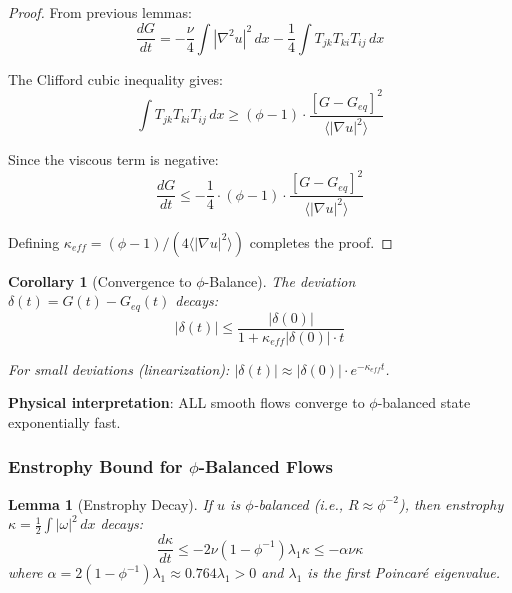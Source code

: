 \documentclass[12pt,a4paper]{article}
\newtheorem{lemma}[theorem]{Lemma}
\newtheorem{corollary}[theorem]{Corollary}
\begin{document}
\begin{proof}
From previous lemmas:
\begin{equation}
\frac{dG}{dt} = -\frac{\nu}{4}\int |\nabla^2 u|^2\, dx - \frac{1}{4}\int T_{jk} T_{ki} T_{ij}\, dx
\end{equation}

The Clifford cubic inequality gives:
\begin{equation}
\int T_{jk} T_{ki} T_{ij}\, dx \geq (\phi - 1) \cdot \frac{[G - G_{eq}]^2}{\langle |\nabla u|^2 \rangle}
\end{equation}

Since the viscous term is negative:
\begin{equation}
\frac{dG}{dt} \leq -\frac{1}{4} \cdot (\phi - 1) \cdot \frac{[G - G_{eq}]^2}{\langle |\nabla u|^2 \rangle}
\end{equation}

Defining $\kappa_{eff} = (\phi - 1)/(4\langle |\nabla u|^2 \rangle)$ completes the proof.
\end{proof}

\begin{corollary}[Convergence to $\phi$-Balance]
The deviation $\delta(t) = G(t) - G_{eq}(t)$ decays:
\begin{equation}
|\delta(t)| \leq \frac{|\delta(0)|}{1 + \kappa_{eff}|\delta(0)| \cdot t}
\end{equation}

For small deviations (linearization): $|\delta(t)| \approx |\delta(0)| \cdot e^{-\kappa_{eff} t}$.
\end{corollary}

\textbf{Physical interpretation}: ALL smooth flows converge to $\phi$-balanced state exponentially fast.

\subsubsection{Enstrophy Bound for $\phi$-Balanced Flows}

\begin{lemma}[Enstrophy Decay]
If $u$ is $\phi$-balanced (i.e., $R \approx \phi^{-2}$), then enstrophy $\kappa = \frac{1}{2}\int |\omega|^2\, dx$ decays:
\begin{equation}
\frac{d\kappa}{dt} \leq -2\nu(1 - \phi^{-1})\lambda_1 \kappa \leq -\alpha\nu \kappa
\end{equation}
where $\alpha = 2(1 - \phi^{-1})\lambda_1 \approx 0.764\lambda_1 > 0$ and $\lambda_1$ is the first Poincaré eigenvalue.
\end{lemma}
\end{document}
